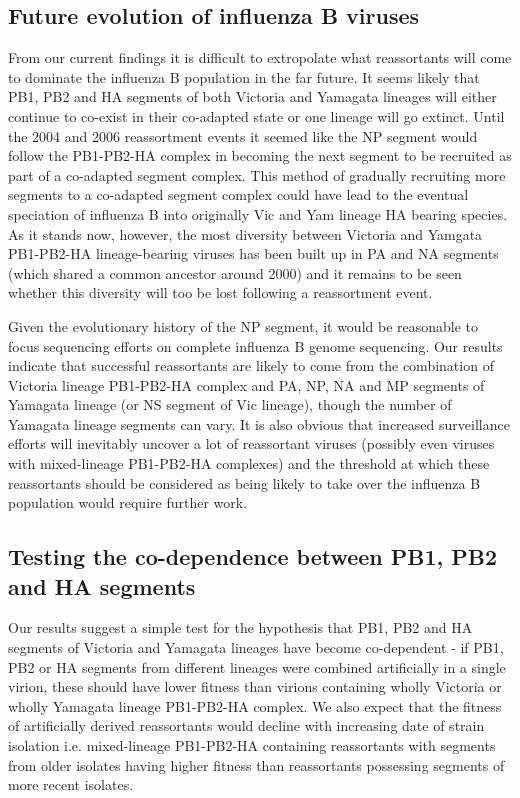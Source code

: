 \documentclass[11pt,oneside,letterpaper]{article}
\begin{document}
\subsection*{Future evolution of influenza B viruses}
From our current findings it is difficult to extropolate what reassortants will come to dominate the influenza B population in the far future.
It seems likely that PB1, PB2 and HA segments of both Victoria and Yamagata lineages will either continue to co-exist in their co-adapted state or one lineage will go extinct.
Until the 2004 and 2006 reassortment events it seemed like the NP segment would follow the PB1-PB2-HA complex in becoming the next segment to be recruited as part of a co-adapted segment complex.
This method of gradually recruiting more segments to a co-adapted segment complex could have lead to the eventual speciation of influenza B into originally Vic and Yam lineage HA bearing species.
As it stands now, however, the most diversity between Victoria and Yamgata PB1-PB2-HA lineage-bearing viruses has been built up in PA and NA segments (which shared a common ancestor around 2000) and it remains to be seen whether this diversity will too be lost following a reassortment event.

Given the evolutionary history of the NP segment, it would be reasonable to focus sequencing efforts on complete influenza B genome sequencing.
Our results indicate that successful reassortants are likely to come from the combination of Victoria lineage PB1-PB2-HA complex and PA, NP, NA and MP segments of Yamagata lineage (or NS segment of Vic lineage), though the number of Yamagata lineage segments can vary.
It is also obvious that increased surveillance efforts will inevitably uncover a lot of reassortant viruses (possibly even viruses with mixed-lineage PB1-PB2-HA complexes) and the threshold at which these reassortants should be considered as being likely to take over the influenza B population would require further work.

\subsection*{Testing the co-dependence between PB1, PB2 and HA segments}
Our results suggest a simple test for the hypothesis that PB1, PB2 and HA segments of Victoria and Yamagata lineages have become co-dependent - if PB1, PB2 or HA segments from different lineages were combined artificially in a single virion, these should have lower fitness than virions containing wholly Victoria or wholly Yamagata lineage PB1-PB2-HA complex.
We also expect that the fitness of artificially derived reassortants would decline with increasing date of strain isolation i.e. mixed-lineage PB1-PB2-HA containing reassortants with segments from older isolates having higher fitness than reassortants possessing segments of more recent isolates.
\end{document}
